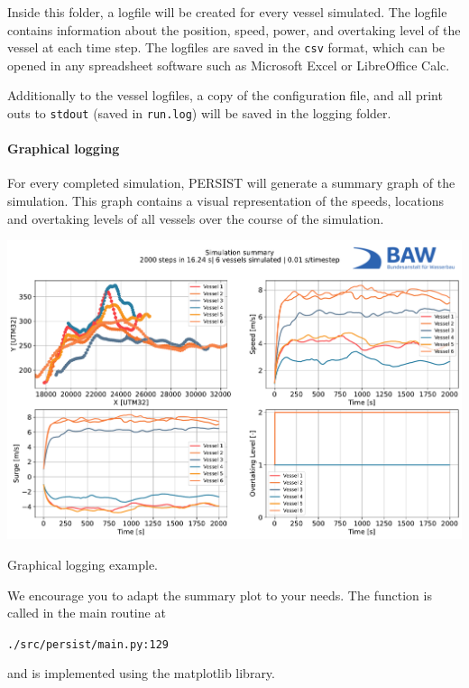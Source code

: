 \documentclass[
	a4paper, %
	12pt, %
]{persist}
\begin{document}
Inside this folder, a logfile will be created for every vessel simulated. The logfile contains information about the position, speed, power, and overtaking level of the vessel at each time step. The logfiles are saved in the \verb|csv| format, which can be opened in any spreadsheet software such as Microsoft Excel or LibreOffice Calc.

Additionally to the vessel logfiles, a copy of the configuration file, and all print outs to \verb|stdout| (saved in \verb|run.log|) will be saved in the logging folder. 

\paragraph{Graphical logging}

For every completed simulation, PERSIST will generate a summary graph of the simulation. This graph contains a visual representation of the speeds, locations and overtaking levels of all vessels over the course of the simulation.
\begin{marginfigure}
	\includegraphics[width=\linewidth]{img/summary.pdf}
	\caption{Graphical logging example.}
	\label{fig:graph}
\end{marginfigure}

We encourage you to adapt the summary plot to your needs. The function is called in the main routine at 

\verb|./src/persist/main.py:129|

and is implemented using the matplotlib library.
\end{document}
